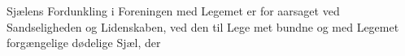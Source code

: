 \documentclass[12pt,a4paper]{book}
\newcommand{\gk}[1]{\textit{#1}}
\begin{document}
Sjælens Fordunkling i Foreningen med Legemet er for\-%
aarsaget ved Sandseligheden og Lidenskaben, ved den til Lege\-%
met bundne og med Legemet forgængelige dødelige Sjæl, der
\end{document}
